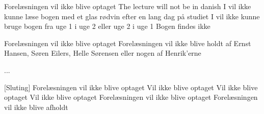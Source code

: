 \documentclass[a4paper,11pt]{article}
\begin{document}
\begin{song}
    Forelæsningen vil ikke blive optaget
    The lecture will not be in danish
    I vil ikke kunne læse bogen med et glas rødvin efter en lang dag på studiet
    I vil ikke kunne bruge bogen fra uge 1 i uge 2 eller uge 2 i uge 1
    Bogen findes ikke

    Forelæsningen vil ikke blive optaget
    Forelæsningen vil ikke blive holdt af Ernst Hansen, Søren Eilers, Helle Sørensen eller nogen af Henrik'erne

    ...


[Sluting] Forelæsningen vil ikke blive optaget
    Vil ikke blive optaget
    Vil ikke blive optaget
    Vil ikke blive optaget
    Forelæsningen vil ikke blive optaget
    Forelæsningen vil ikke blive afholdt


    
\end{song}
\end{document}
